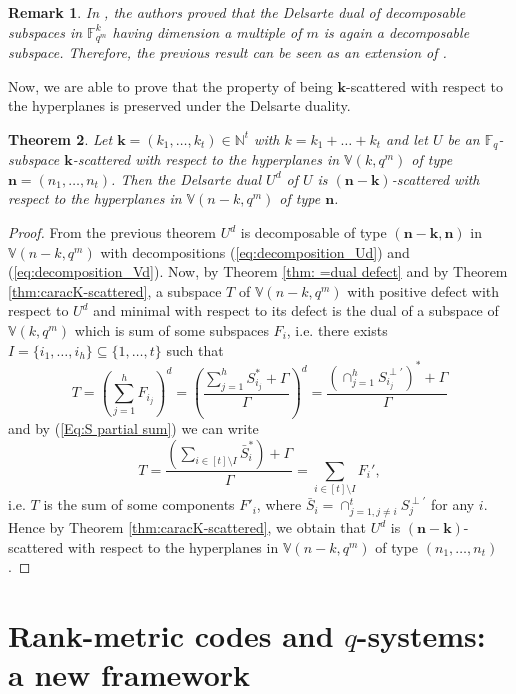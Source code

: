 \documentclass[11pt]{amsart}
\newtheorem{theorem}{Theorem}[section]
\newtheorem{remark}[theorem]{Remark}
\newcommand{\fqm}{\mathbb{F}_{q^m}}
\newcommand{\fq}{{\mathbb F}_{q}}
\begin{document}
\begin{remark}
     In \cite{bartoli2024Exceptional_sequences}, the authors proved that the Delsarte dual of decomposable subspaces in $\fqm^k$ having dimension a multiple of $m$ is again a decomposable subspace. Therefore, the previous result can be seen as an extension of \cite[Proposition 2.8]{bartoli2024Exceptional_sequences}.
\end{remark}

Now, we are able to prove that the property of being $\mathbf{k}$-scattered with respect to the hyperplanes is preserved under the Delsarte duality.

\begin{theorem} \label{th:dual k-bold scattered}
 Let $\mathbf{k}=(k_1,\ldots,k_t)\in\mathbb N^t$ with $k=k_1+\ldots+k_t$ and let $U$ be an $\fq$-subspace  $\mathbf{k}$-scattered with respect to the hyperplanes in $\mathbb{V}(k,q^m)$ of type $\mathbf{n}=(n_1,\dots,n_t)$.
 Then the Delsarte dual $U^d$ of $U$ is $(\mathbf{n}-\mathbf{k})$-scattered with respect to the hyperplanes in $\mathbb{V}(n-k,q^m)$ of type $\mathbf{n}$.    
\end{theorem}
\begin{proof}
From the previous theorem $U^d$  is decomposable of type $(\mathbf{n}-\mathbf{k}, \mathbf{n})$ in $\mathbb{V}(n-k,q^m)$ with decompositions (\ref{eq:decomposition_Ud}) and (\ref{eq:decomposition_Vd}).
Now, by Theorem \ref{thm: =dual defect} and by Theorem \ref{thm:caracK-scattered}, a subspace $T$ of $\mathbb{V}(n-k,q^m)$ with positive defect with respect to $U^d$ and minimal with respect to its defect is the dual of a subspace of $\mathbb{V}(k,q^m)$ which is  sum of some subspaces $F_i$, i.e. there exists $I=\{i_1,\ldots,i_h\}\subseteq\{1,\ldots,t\}$ such that
\[T=\left(\sum_{j=1}^{h} F_{i_j}\right)^d=\left(\frac{\sum_{j=1}^{h}S_{i_j}^*+\Gamma}{\Gamma}\right)^d=\frac{(\cap_{j=1}^{h}S_{i_j}^{\perp'})^*+\Gamma}{\Gamma}\]
and by (\ref{Eq:S partial sum}) we can write
\[T=\frac{(\sum_{i\in [t]\setminus I }^{}\bar{S}_{i}^*)+\Gamma}{\Gamma}=\sum_{i\in [t]\setminus I}^{} F_i',\]
i.e. $T$ is the sum of some components $F'_i$, where $\bar{S}_i=\cap_{j=1, j\neq i}^{t} S_j^{\perp'}$ for any $i$.
Hence by Theorem \ref{thm:caracK-scattered}, we obtain that $U^d$ is $(\mathbf{n}-\mathbf{k})$-scattered with respect to the hyperplanes in $\mathbb{V}(n-k,q^m)$ of type $(n_1,\dots,n_t)$. 
\end{proof}

\section{Rank-metric codes and $q$-systems: a new framework}
\end{document}
